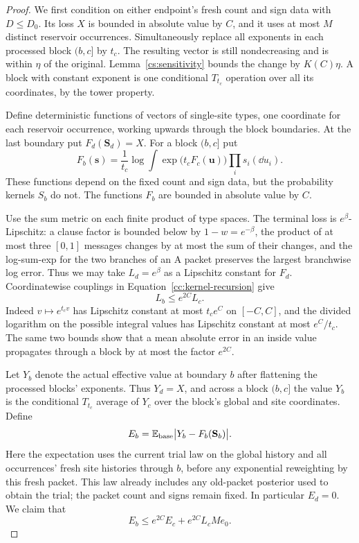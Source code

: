 \begin{proof}
We first condition on either endpoint's fresh count and sign data with
$D\le D_0$.  Its loss $X$ is bounded in absolute value by $C$, and it
uses at most $M$ distinct reservoir occurrences.  Simultaneously replace
all exponents in each processed block $(b,c]$ by $t_c$.  The resulting
vector is still nondecreasing and is within $\eta$ of the original.
Lemma~\ref{cs:sensitivity} bounds the change by $K(C)\eta$.
A block with constant exponent is one conditional $T_{t_c}$ operation
over all its coordinates, by the tower property.

Define deterministic functions of vectors of single-site types,
one coordinate for each reservoir occurrence, working upwards through
the block boundaries.  At the last boundary put
$F_d(\mathbf S_d)=X$.  For a block $(b,c]$ put
\begin{equation}\label{cc:kernel-recursion}
 F_b(\mathbf s)=\frac1{t_c}\log\int
       \exp\bigl(t_cF_c(\mathbf u)\bigr)\prod_i s_i(\dd u_i).
\end{equation}
These functions depend on the fixed count and sign data, but the
probability kernels $S_b$ do not.  The functions $F_b$ are bounded in
absolute value by $C$.

Use the sum metric on each finite product of type spaces.  The terminal
loss is $e^\beta$-Lipschitz: a clause factor is bounded below by
$1-w=e^{-\beta}$, the product of at most three $[0,1]$ messages changes
by at most the sum of their changes, and the log-sum-exp for the two
branches of an A packet preserves the largest branchwise log error.
Thus we may take $L_d=e^\beta$ as a Lipschitz constant for $F_d$.
Coordinatewise couplings in Equation~\eqref{cc:kernel-recursion} give
\begin{equation}\label{cc:lipschitz-recursion}
 L_b\le e^{2C}L_c.
\end{equation}
Indeed $v\mapsto e^{t_cv}$ has Lipschitz constant at most $t_ce^C$ on
$[-C,C]$, and the divided logarithm on the possible integral values
has Lipschitz constant at most $e^C/t_c$.  The same two bounds show that
a mean absolute error in an inside value propagates through a block
by at most the factor $e^{2C}$.

Let $Y_b$ denote the actual effective value at boundary $b$ after
flattening the processed blocks' exponents.  Thus $Y_d=X$, and across
a block $(b,c]$ the value $Y_b$ is the conditional $T_{t_c}$ average
of $Y_c$ over the block's global and site coordinates.  Define
\[
 E_b=\mathbb E_{\mathrm{base}}
       \bigl|Y_b-F_b(\mathbf S_b)\bigr|.
\]
Here the expectation uses the current trial law on the global history
and all occurrences' fresh site histories through $b$, before any
exponential reweighting by this fresh packet.  This law already includes
any old-packet posterior used to obtain the trial; the packet count and
signs remain fixed.  In particular $E_d=0$.  We claim that
\begin{equation}
 E_b\le e^{2C}E_c+e^{2C}L_cMe_0.
 \label{cc:one-block-error}
\end{equation}


\end{proof}
